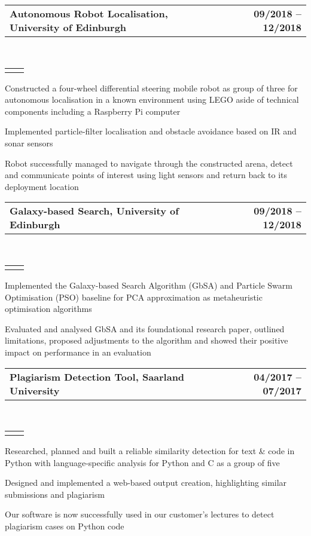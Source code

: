 \documentclass[]{deedy-resume}
\makeatletter
\newcommand{\headerrow}[2]
{\begin{tabular*}{\linewidth}{l@{\extracolsep{\fill}}r}
	\fontspec{Helvetica}\fontsize{12pt}{12pt}\selectfont\bfseries{\color{subheadings}#1} &
	\fontspec{Helvetica}\fontsize{12pt}{12pt}\selectfont\bfseries{\color{subheadings}#2} \\
\end{tabular*}}
\newcommand{\locationrow}[2]
{\begin{tabular*}{\linewidth}{l@{\extracolsep{\fill}}r}
        \color{headings}\scshape\fontspec{Heiti TC Medium}\fontsize{10pt}{12pt}\selectfont{#1}  &
        \color{headings}\scshape\fontspec{Heiti TC Medium}\fontsize{10pt}{12pt}\selectfont{#2}  \\
\end{tabular*}}
\makeatother
\begin{document}
\noindent
\headerrow{Autonomous Robot Localisation, University of Edinburgh}{09/2018 -- 12/2018}
\\
\locationrow{Group Project for Robotics: Science and Systems Lecture}{}
\begin{tightitemize}{1.7em}
    \item Constructed a four-wheel differential steering mobile robot as group of three for autonomous localisation in a 
    known environment using LEGO aside of technical components including a Raspberry Pi computer
    \item Implemented particle-filter localisation and obstacle avoidance based on IR and sonar sensors
    \item Robot successfully managed to navigate through the constructed arena, detect and communicate points of
    interest using light sensors and return back to its deployment location
\end{tightitemize}
\largesectionsep

\noindent
\headerrow{Galaxy-based Search, University of Edinburgh}{09/2018 -- 12/2018}
\\
\locationrow{Group Project for Natural Computing Lecture}{}
\begin{tightitemize}{1.7em}
    \item Implemented the Galaxy-based Search Algorithm (GbSA) and Particle Swarm Optimisation (PSO) baseline 
    for PCA approximation as metaheuristic optimisation algorithms
    \item Evaluated and analysed GbSA and its foundational research paper, outlined limitations, proposed adjustments to 
    the algorithm and showed their positive impact on performance in an evaluation
\end{tightitemize}
\largesectionsep

\noindent
\headerrow{Plagiarism Detection Tool, Saarland University}{04/2017 -- 07/2017}
\\
\locationrow{Group Project for Software Engineering Lecture}{}
\begin{tightitemize}{1.7em}
    \item Researched, planned and built a reliable similarity detection for text \& code in Python with language-specific analysis for Python and C as a group of five
    \item Designed and implemented a web-based output creation, highlighting similar submissions and plagiarism
    \item Our software is now successfully used in our customer's lectures to detect plagiarism cases on Python code
\end{tightitemize}
\largesectionsep
\end{document}
